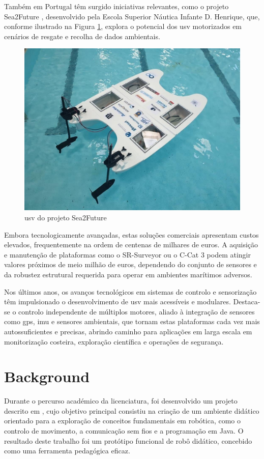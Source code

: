 Também em Portugal têm surgido iniciativas relevantes, como o projeto Sea2Future \cite{sea2future,sea2future2}, desenvolvido pela Escola Superior Náutica Infante D. Henrique, que, conforme ilustrado na Figura \ref{fig:sea2future}, explora o potencial dos \gls{usv} motorizados em cenários de resgate e recolha de dados ambientais.

\begin{figure}[H]
    \centering
    \includegraphics[width=0.5\linewidth]{figuras/sea2future.jpg}
    \caption[\gls{usv} do projeto Sea2Future]{\gls{usv} do projeto Sea2Future \cite{sea2future,sea2future2}}
    \label{fig:sea2future}
\end{figure}

Embora tecnologicamente avançadas, estas soluções comerciais apresentam custos elevados, frequentemente na ordem de centenas de milhares de euros. A aquisição e manutenção de plataformas como o SR-Surveyor ou o C-Cat 3 podem atingir valores próximos de meio milhão de euros, dependendo do conjunto de sensores e da robustez estrutural requerida para operar em ambientes marítimos adversos.  

Nos últimos anos, os avanços tecnológicos em sistemas de controlo e sensorização têm impulsionado o desenvolvimento de \gls{usv} mais acessíveis e modulares. Destaca-se o controlo independente de múltiplos motores, aliado à integração de sensores como \gls{gps}, \gls{imu} e sensores ambientais, que tornam estas plataformas cada vez mais autossuficientes e precisas, abrindo caminho para aplicações em larga escala em monitorização costeira, exploração científica e operações de segurança.

\section{Background} 
\label{sec:background}

Durante o percurso académico da licenciatura, foi desenvolvido um projeto descrito em \cite{didactic-robot-thesis}, cujo objetivo principal consistiu na criação de um ambiente didático orientado para a exploração de conceitos fundamentais em robótica, como o controlo de movimento, a comunicação sem fios e a programação em Java. O resultado deste trabalho foi um protótipo funcional de robô didático, concebido como uma ferramenta pedagógica eficaz.  

